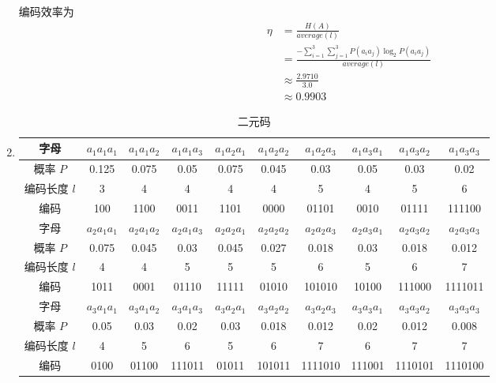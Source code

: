 \documentclass{ctexart}
\begin{document}
\begin{enumerate}
    编码效率为
    \begin{align}
        \eta &= \frac{H(A)}{average(l)} \\
        &= \frac{-\sum_{i=1}^3\sum_{j=1}^3 P(a_ia_j)\log_2 P(a_ia_j)}{average(l)} \\
        &\approx \frac{2.9710}{3.0} \\
        &\approx 0.9903
    \end{align}

    \item\begin{table}[H]
        \centering
        \caption{二元码}
        \begin{tabular}{c|c|c|c|c|c|c|c|c|c}
            \hline
            字母 & $a_1a_1a_1$ & $a_1a_1a_2$ & $a_1a_1a_3$ & $a_1a_2a_1$ & $a_1a_2a_2$ & $a_1a_2a_3$ & $a_1a_3a_1$ & $a_1a_3a_2$ & $a_1a_3a_3$ \\
            \hline
            概率 $P$ & 0.125 & 0.075 & 0.05 & 0.075 & 0.045 & 0.03 & 0.05 & 0.03 & 0.02 \\
            编码长度 $l$ & 3 & 4 & 4 & 4 & 4 & 5 & 4 & 5 & 6 \\
            编码 & 100 & 1100 & 0011 & 1101 & 0000 & 01101 & 0010 & 01111 & 111100 \\
            \hline
            字母 & $a_2a_1a_1$ & $a_2a_1a_2$ & $a_2a_1a_3$ & $a_2a_2a_1$ & $a_2a_2a_2$ & $a_2a_2a_3$ & $a_2a_3a_1$ & $a_2a_3a_2$ & $a_2a_3a_3$ \\
            \hline
            概率 $P$ & 0.075 & 0.045 & 0.03 & 0.045 & 0.027 & 0.018 & 0.03 & 0.018 & 0.012 \\
            编码长度 $l$ & 4 & 4 & 5 & 5 & 5 & 6 & 5 & 6 & 7 \\
            编码 & 1011 & 0001 & 01110  & 11111 & 01010 & 101010 & 10100 & 111000 & 1111011 \\
            \hline
            字母 & $a_3a_1a_1$ & $a_3a_1a_2$ & $a_3a_1a_3$ & $a_3a_2a_1$ & $a_3a_2a_2$ & $a_3a_2a_3$ & $a_3a_3a_1$ & $a_3a_3a_2$ & $a_3a_3a_3$ \\
            \hline
            概率 $P$ & 0.05 & 0.03 & 0.02 & 0.03 & 0.018 & 0.012 & 0.02 & 0.012 & 0.008 \\
            编码长度 $l$ & 4 & 5 & 6 & 5 & 6 & 7 & 6 & 7 & 7 \\
            编码 & 0100 & 01100 & 111011 & 01011 & 101011 & 1111010 & 111001 & 1110101 & 1110100 \\
            \hline
        \end{tabular}
    \end{table}


\end{enumerate}
\end{document}
